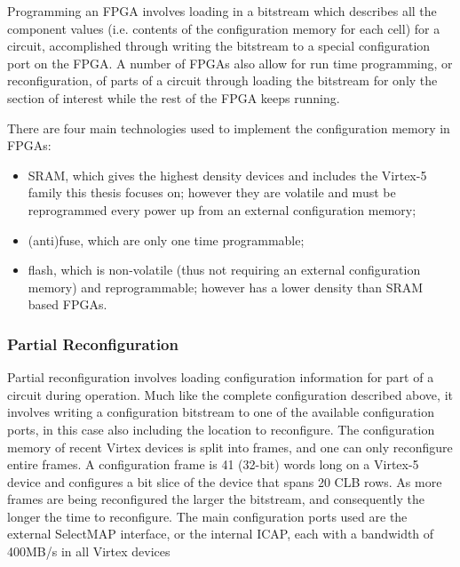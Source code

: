 \documentclass[12pt,final,oneside]{memoir} %
\begin{document}
Programming an \ac{FPGA} involves loading in a bitstream which describes all the component values (i.e. contents of the configuration memory for each cell) for a circuit, accomplished through writing the bitstream to a special configuration port on the \ac{FPGA}. A number of \acp{FPGA} also allow for run time programming, or reconfiguration, of parts of a circuit through loading the bitstream for only the section of interest while the rest of the \ac{FPGA} keeps running.

There are four main technologies used to implement the configuration memory in \acp{FPGA}:
\begin{itemize}
\item \ac{SRAM}, which gives the highest density devices and includes the Virtex-5 family this thesis focuses on; however they are volatile and must be reprogrammed every power up from an external configuration memory;
\item (anti)fuse, which are only one time programmable;
\item flash, which is non-volatile (thus not requiring an external configuration memory) and reprogrammable; however has a lower density than \ac{SRAM} based \acp{FPGA}\cite{FPGAArch}.
\end{itemize}
\subsubsection{Partial Reconfiguration}
Partial reconfiguration involves loading configuration information for part of a circuit during operation. Much like the complete configuration described above, it involves writing a configuration bitstream to one of the available configuration ports, in this case also including the location to reconfigure. The configuration memory of recent Virtex devices is split into frames, and one can only reconfigure entire frames. A configuration frame is 41 (32-bit) words long on a Virtex-5 device and configures a bit slice of the device that spans 20 \ac{CLB} rows. As more frames are being reconfigured the larger the bitstream, and consequently the longer the time to reconfigure. The main configuration ports used are the external SelectMAP interface, or the internal \ac{ICAP}, each with a bandwidth of 400MB/s in all Virtex devices \cite{XCell33,DiesselChange}
\end{document}

